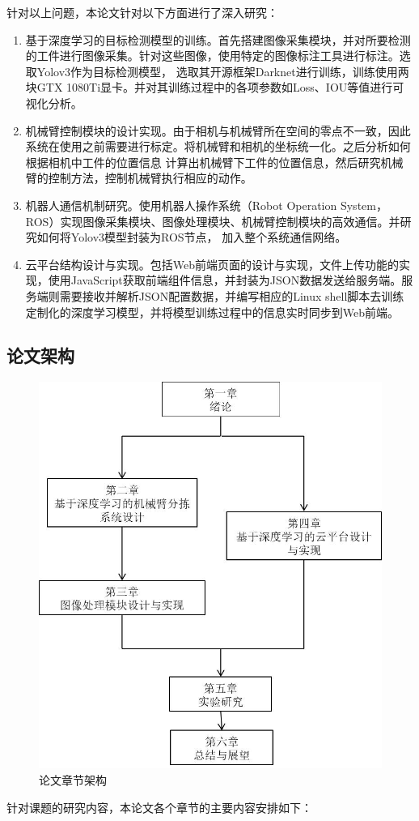 针对以上问题，本论文针对以下方面进行了深入研究：
\begin{enumerate}
    \item{基于深度学习的目标检测模型的训练。首先搭建图像采集模块，并对所要检测的工件进行图像采集。针对这些图像，使用特定的图像标注工具进行标注。选取Yolov3作为目标检测模型，
    选取其开源框架Darknet进行训练，训练使用两块GTX 1080Ti显卡。并对其训练过程中的各项参数如Loss、IOU等值进行可视化分析。}
    \item{机械臂控制模块的设计实现。由于相机与机械臂所在空间的零点不一致，因此系统在使用之前需要进行标定。将机械臂和相机的坐标统一化。之后分析如何根据相机中工件的位置信息
    计算出机械臂下工件的位置信息，然后研究机械臂的控制方法，控制机械臂执行相应的动作。}
    \item{机器人通信机制研究。使用机器人操作系统（Robot Operation System，ROS）实现图像采集模块、图像处理模块、机械臂控制模块的高效通信。并研究如何将Yolov3模型封装为ROS节点，
    加入整个系统通信网络。}
    \item{云平台结构设计与实现。包括Web前端页面的设计与实现，文件上传功能的实现，使用JavaScript获取前端组件信息，并封装为JSON数据发送给服务端。服务端则需要接收并解析JSON配置数据，并编写相应的Linux
     shell脚本去训练定制化的深度学习模型，并将模型训练过程中的信息实时同步到Web前端。}
\end{enumerate}

\subsection{论文架构}
\begin{figure}
    \centering
    \includegraphics[scale=0.8]{pic/chap1/paper_construct.jpg}
    \caption{论文章节架构}
    \label{fig:paper_construct}
\end{figure}
针对课题的研究内容，本论文各个章节的主要内容安排如下：


